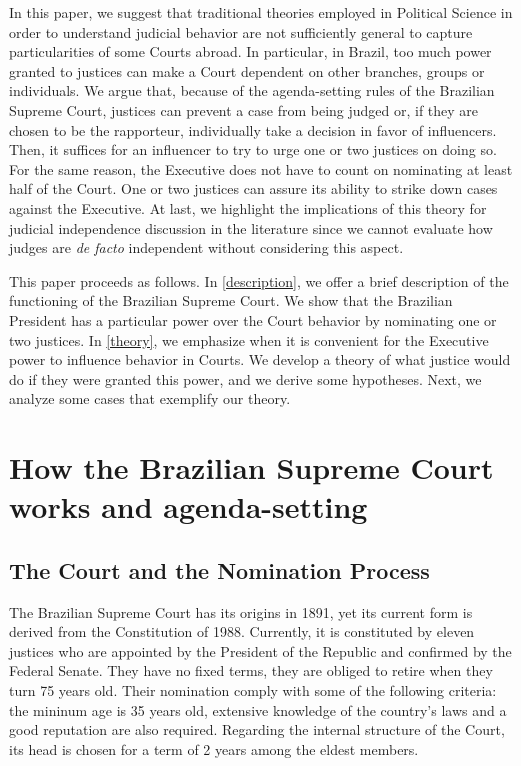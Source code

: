 \documentclass[12pt, a4paper]{article}
\begin{document}
In this paper, we suggest that traditional theories employed in Political Science in order to understand judicial behavior are not sufficiently general to capture particularities of some Courts abroad. In particular, in Brazil, too much power granted to justices can make a Court dependent on other branches, groups or individuals.  We argue that, because of the agenda-setting rules of the Brazilian Supreme Court, justices can prevent a case from being judged or, if they are chosen to be the rapporteur, individually take a decision in favor of  influencers. Then, it suffices for an influencer to try to urge one or two justices on doing so.  For the same reason, the Executive does not have to count on nominating at least half of the Court. One or two justices can assure its ability to  strike down cases against the Executive. At last, we highlight the implications of this theory for judicial independence discussion in the literature since we cannot evaluate how judges are \emph{de facto} independent without considering this aspect.

This paper proceeds as follows. In \autoref{description}, we offer a brief description of the functioning of the Brazilian Supreme Court. We show that the Brazilian President has a particular power over the Court behavior by nominating one or two justices. In  \autoref{theory}, we emphasize when it is convenient
for the Executive power to influence behavior in Courts.  We develop a theory of what justice would do if they were granted this power, and we derive some hypotheses. Next, we analyze some cases that exemplify our theory.



\section{How the Brazilian Supreme Court works and agenda-setting}
\label{description}

\subsection{The Court and the Nomination Process}

The Brazilian Supreme Court has its origins in 1891, yet its current form is derived from the Constitution of 1988. Currently, it is constituted by eleven justices who are appointed by the President of the Republic and confirmed by the Federal Senate. They have no fixed terms, they are obliged to retire when they turn
75 years old. Their nomination comply with some of the following criteria: the mininum age is
35 years old, extensive knowledge of the country's laws and a good reputation are also required. Regarding the internal structure of the Court, its head is chosen for a term of 2 years among the eldest members.
\end{document}
